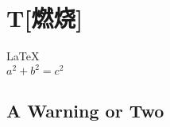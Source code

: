 \documentclass{article}
\begin{document}
               
 
\section{T[燃烧]}          
\LaTeX \,\\ 
 $a^2+b^2=c^2$

\subsection{A Warning or Two}  

\end{document}
